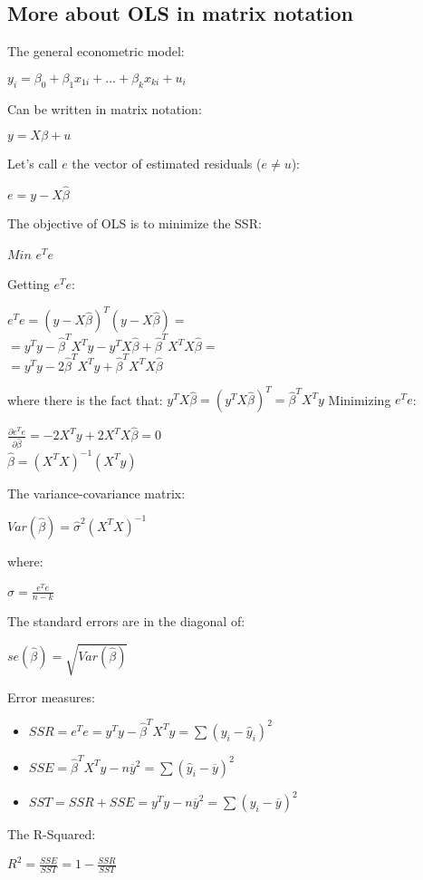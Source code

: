 \documentclass[10pt, a4paper, landscape]{extarticle}
\begin{document}
\begin{multicols}{3}
\section*{More about OLS in matrix notation}
	The general econometric model:
	\begin{center}
		$y_i = \beta_0 + \beta_1 x_{1i} + ... + \beta_k x_{ki} + u_i$
	\end{center}
	Can be written in matrix notation:
	\begin{center}
		$y = X \beta + u$
	\end{center}
	Let's call $e$ the vector of estimated residuals ($e \neq u$):
	\begin{center}
		$e = y - X \hat{\beta}$
	\end{center}
	The objective of OLS is to minimize the SSR:
	\begin{center}
		$Min$ \quad $e^T e$
	\end{center}
	Getting $e^T e$:
	\begin{center}
		$e^T e = (y - X \hat{\beta})^T (y - X \hat{\beta}) =$
		\\ $= y^T y - \hat{\beta}^T X^T y - y^T X \hat{\beta} + \hat{\beta}^T X^T X \hat{\beta} =$
		\\ $= y^T y -2 \hat{\beta}^T X^T y + \hat{\beta}^T X^T X \hat{\beta}$
	\end{center}
	where there is the fact that: $y^T X \hat{\beta} = (y^T X \hat{\beta})^T = \hat{\beta}^T X^T y$
	Minimizing $e^T e$:
	\begin{center}
		$\frac{\partial e^T e}{\partial \hat{\beta}} = -2 X^T y +2 X^T X \hat{\beta} = 0$
		\\ $\hat{\beta} = (X^T X)^{-1} (X^T y)$
	\end{center}
	The variance-covariance matrix:
	\begin{center}
		$Var(\hat{\beta}) = \hat{\sigma}^2 (X^T X)^{-1}$
	\end{center}
	where:
	\begin{center}
		$\hat{\sigma} = \frac{e^T e}{n - k}$
	\end{center}
	The standard errors are in the diagonal of:
	\begin{center}
		$se(\hat{\beta}) = \sqrt{Var(\hat{\beta})}$
	\end{center}
	Error measures:
	\begin{itemize}[leftmargin=*]
		\item $SSR = e^T e = y^T y - \hat{\beta}^T X^T y = \sum(y_i - \hat{y}_i)^2$
		\item $SSE = \hat{\beta}^T X^T y - n \overline{y}^2 = \sum(\hat{y}_i - \overline{y})^2$
		\item $SST = SSR + SSE = y^T y - n \overline{y}^2 = \sum(y_i - \overline{y})^2$
	\end{itemize}
	The R-Squared:
	\begin{center}
		$R^2 = \frac{SSE}{SST} = 1 - \frac{SSR}{SST}$
	\end{center}


\end{multicols}
\end{document}
